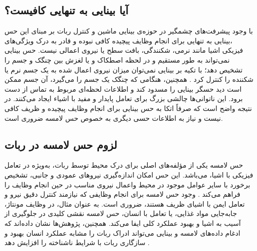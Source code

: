 \subsection{آیا بینایی به تنهایی کافیست؟}

با وجود پیشرفت‌های چشمگیر در حوزه‌ی بینایی ماشین
و کنترل ربات بر مبنای این حس
،بینایی به تنهایی برای انجام وظایف پیچیده کافی نبوده و قادر به درک ویژگی‌های فیزیکی اشیا مانند نرمی، شکنندگی، بافت سطح یا نیروی اعمالی نیست. حس بینایی نمی‌تواند به طور مستقیم و در لحظه اصطکاک و یا لغزش بین چنگک و جسم را تشخیص دهد؛ با تکیه بر بینایی نمی‌توان میزان نیروی اعمال شده به یک جسم نرم یا شکننده را کنترل کرد
\cite{yamaguchi2019recent,chi2018recent}.
همچنین، هنگامی که چنگک
 یک جسم را می‌گیرد، آن جسم ممکن است دید حسگر بینایی را مسدود کند و اطلاعات لحظه‌ای مربوط به تماس از دست برود. این ناتوانی‌ها چالشی بزرگ برای تعامل پایدار و مفید با اشیاء ایجاد می‌کنند. در نتیجه واضح است که صرفاً اتکا به حس بینایی برای انجام وظایف پیچیده و ظریف کافی نیست و نیاز به اطلاعات حسی دیگری به‌ خصوص حس لامسه ضروری است.
\subsection{لزوم حس لامسه در ربات}
حس لامسه یکی از مؤلفه‌های اصلی برای درک محیط توسط ربات، به‌ویژه در تعامل فیزیکی با اشیا، می‌باشد. این حس امکان اندازه‌گیری نیروهای عمودی و جانبی، تشخیص برخورد با سایر عوامل موجود در محیط واعمال نیروی مناسب در حین انجام وظایف را فراهم می‌کند
\cite{zou2017novel, yousef2011tactile}.
وجود حس لامسه برای انجام وظایفی که نیازمند کنترل دقیق نیرو و تعامل ایمن با اشیای ظریف هستند، ضروری است. به عنوان مثال، در وظایف مونتاژ، جابه‌جایی مواد غذایی، یا تعامل با انسان، حس لامسه نقشی کلیدی در جلوگیری از آسیب به اشیا و بهبود عملکرد کلی ایفا می‌کند.
همچنین، پژوهش‌ها نشان داده‌اند که ادغام داده‌های لامسه و بینایی می‌تواند ادراک ربات را مشابه عملکرد انسان بهبود و سازگاری ربات با شرایط ناشناخته را افزایش دهد
\cite{dahiya2013robotic}.

